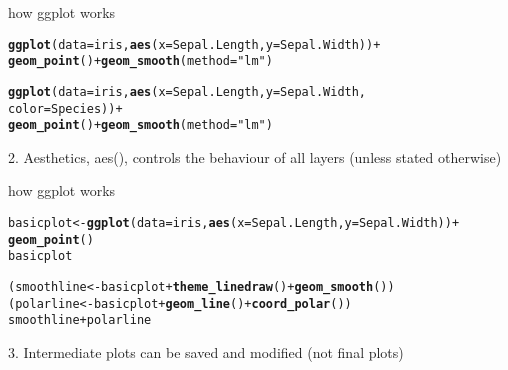 \documentclass[10pt]{beamer}\usepackage[]{graphicx}\usepackage[]{color}
\makeatletter
\newcommand{\hlstr}[1]{\textcolor[rgb]{0.192,0.494,0.8}{#1}}%
\newcommand{\hlopt}[1]{\textcolor[rgb]{0,0,0}{#1}}%
\newcommand{\hlstd}[1]{\textcolor[rgb]{0.345,0.345,0.345}{#1}}%
\newcommand{\hlkwb}[1]{\textcolor[rgb]{0.69,0.353,0.396}{#1}}%
\newcommand{\hlkwc}[1]{\textcolor[rgb]{0.333,0.667,0.333}{#1}}%
\newcommand{\hlkwd}[1]{\textcolor[rgb]{0.737,0.353,0.396}{\textbf{#1}}}%
\newenvironment{kframe}{%
 \def\at@end@of@kframe{}%
 \ifinner\ifhmode%
  \def\at@end@of@kframe{\end{minipage}}%
  \begin{minipage}{\columnwidth}%
 \fi\fi%
 \def\FrameCommand##1{\hskip\@totalleftmargin \hskip-\fboxsep
 \colorbox{shadecolor}{##1}\hskip-\fboxsep
     \hskip-\linewidth \hskip-\@totalleftmargin \hskip\columnwidth}%
 \MakeFramed {\advance\hsize-\width
   \@totalleftmargin\z@ \linewidth\hsize
   \@setminipage}}%
 {\par\unskip\endMakeFramed%
 \at@end@of@kframe}
\newenvironment{knitrout}{}{} %
\makeatother
\begin{document}
\begin{frame}[fragile]{how ggplot works}

\begin{knitrout}
\color{fgcolor}\begin{kframe}
\begin{alltt}
\hlkwd{ggplot}\hlstd{(}\hlkwc{data}\hlstd{=iris,} \hlkwd{aes}\hlstd{(}\hlkwc{x}\hlstd{=Sepal.Length,} \hlkwc{y}\hlstd{=Sepal.Width))} \hlopt{+}
  \hlkwd{geom_point}\hlstd{()} \hlopt{+} \hlkwd{geom_smooth}\hlstd{(}\hlkwc{method} \hlstd{=} \hlstr{"lm"}\hlstd{)}
\end{alltt}
\end{kframe}
\end{knitrout}

\pause

\begin{knitrout}
\color{fgcolor}\begin{kframe}
\begin{alltt}
\hlkwd{ggplot}\hlstd{(}\hlkwc{data}\hlstd{=iris,} \hlkwd{aes}\hlstd{(}\hlkwc{x}\hlstd{=Sepal.Length,} \hlkwc{y}\hlstd{=Sepal.Width,}
                      \hlkwc{color}\hlstd{= Species))} \hlopt{+}
  \hlkwd{geom_point}\hlstd{()} \hlopt{+} \hlkwd{geom_smooth}\hlstd{(}\hlkwc{method} \hlstd{=} \hlstr{"lm"}\hlstd{)}
\end{alltt}
\end{kframe}
\end{knitrout}

\alert{\Large 2. Aesthetics, aes(), controls the behaviour of all layers (unless stated otherwise)}
\end{frame}


\begin{frame}[fragile]{how ggplot works}

\begin{knitrout}
\color{fgcolor}\begin{kframe}
\begin{alltt}
\hlstd{basicplot} \hlkwb{<-} \hlkwd{ggplot}\hlstd{(}\hlkwc{data}\hlstd{=iris,} \hlkwd{aes}\hlstd{(}\hlkwc{x}\hlstd{=Sepal.Length,} \hlkwc{y}\hlstd{=Sepal.Width))} \hlopt{+}
  \hlkwd{geom_point}\hlstd{()}
\hlstd{basicplot}

\hlstd{(smoothline} \hlkwb{<-} \hlstd{basicplot} \hlopt{+} \hlkwd{theme_linedraw}\hlstd{()} \hlopt{+} \hlkwd{geom_smooth}\hlstd{())}
\hlstd{(polarline} \hlkwb{<-} \hlstd{basicplot} \hlopt{+} \hlkwd{geom_line}\hlstd{()} \hlopt{+} \hlkwd{coord_polar}\hlstd{())}
\hlstd{smoothline} \hlopt{+} \hlstd{polarline}
\end{alltt}
\end{kframe}
\end{knitrout}

\pause

\alert{\Large 3. Intermediate plots can be saved and modified (not final plots)}
\end{frame}
\end{document}
